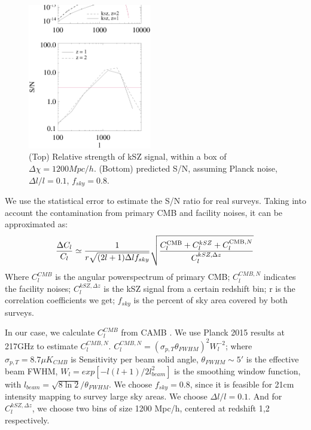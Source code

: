\begin{figure}[tbp]
\begin{center}
\includegraphics[width=0.48\textwidth]{Cl_sn_z1z2.eps}
\end{center}
\vspace{-0.7cm}
\caption{(Top) Relative strength of kSZ signal, within a box of $\Delta \chi=1200 Mpc/h$. 
    (Bottom) predicted S/N, assuming Planck noise, $\Delta l/l=0.1$, $f_{sky}=0.8$. 
}
\label{fig:sn}
\end{figure}
We use the statistical error to estimate the S/N ratio for real surveys. 
Taking into account the contamination from primary CMB and facility noises, it can be approximated as:
\begin{eqnarray}
    \frac{\Delta C_l}{C_l}\simeq \frac{1}{r\sqrt{(2l+1)\Delta l f_{sky}}}\sqrt{\frac{C_l^{\mathrm{CMB}}+C_l^{kSZ}+C_l^{\mathrm{CMB},N}}{C_l^{kSZ,\Delta z}}}\,
\end{eqnarray}
Where $C_l^{CMB}$ is the angular powerspectrum of primary CMB; 
$C_l^{CMB,N}$ indicates the facility noises; 
$C_l^{kSZ,\Delta z}$ is the kSZ signal from a certain redshift bin; 
r is the correlation coefficients we get; 
$f_{sky}$ is the percent of sky area covered by both surveys.

In our case, we calculate $C_l^{CMB}$ from CAMB \cite{CAMB}. 
We use Planck 2015 results \cite{Planck2015} at 217GHz to estimate $C_l^{CMB,N}$.
$C_l^{CMB,N}=(\sigma_{p,T}\theta_{FWHM})^2W_l^{-2}$;  
where $\sigma_{p,T}=8.7\mu K_{CMB}$ is Sensitivity per beam solid angle, 
$\theta_{FWHM}\sim 5'$ is the effective beam FWHM, 
$W_l=exp[-l(l+1)/2l^2_{beam}]$ is the smoothing window function, 
with $l_{beam}=\sqrt{8\ln2}/\theta_{FWHM}$. 
We choose $f_{sky}=0.8$, since it is feasible for 21cm intensity mapping to survey large sky areas. 
We choose $\Delta l/l=0.1$. 
And for $C_l^{kSZ,\Delta z}$, we choose two bins of size 1200 Mpc/h, centered at redshift 1,2 respectively.


